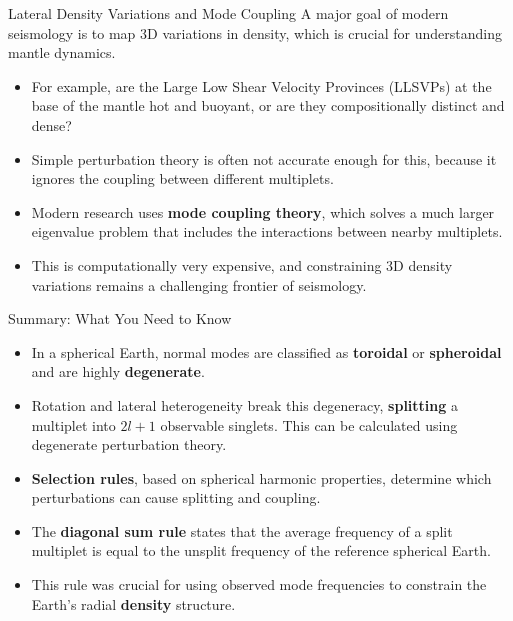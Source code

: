 \documentclass{beamer}
\begin{document}
\begin{frame}{Lateral Density Variations and Mode Coupling}
    A major goal of modern seismology is to map 3D variations in density, which is crucial for understanding mantle dynamics.
    \begin{itemize}
        \item For example, are the Large Low Shear Velocity Provinces (LLSVPs) at the base of the mantle hot and buoyant, or are they compositionally distinct and dense?
        \pause
        \item Simple perturbation theory is often not accurate enough for this, because it ignores the coupling between different multiplets.
        \pause
        \item Modern research uses \textbf{mode coupling theory}, which solves a much larger eigenvalue problem that includes the interactions between nearby multiplets.
        \pause
        \item This is computationally very expensive, and constraining 3D density variations remains a challenging frontier of seismology.
    \end{itemize}
\end{frame}


\begin{frame}{Summary: What You Need to Know}
    \begin{itemize}
        \item In a spherical Earth, normal modes are classified as \textbf{toroidal} or \textbf{spheroidal} and are highly \textbf{degenerate}.
        \pause
        \item Rotation and lateral heterogeneity break this degeneracy, \textbf{splitting} a multiplet into $2l+1$ observable singlets. This can be calculated using degenerate perturbation theory.
        \pause
        \item \textbf{Selection rules}, based on spherical harmonic properties, determine which perturbations can cause splitting and coupling.
        \pause
        \item The \textbf{diagonal sum rule} states that the average frequency of a split multiplet is equal to the unsplit frequency of the reference spherical Earth.
        \pause
        \item This rule was crucial for using observed mode frequencies to constrain the Earth's radial \textbf{density} structure.
    \end{itemize}
\end{frame}
\end{document}
